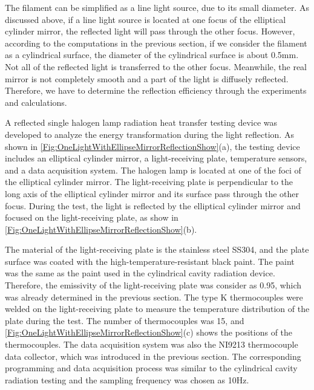 The filament can be simplified as a line light source, due to its small diameter. As discussed above, if a line light source is located at one focus of the elliptical cylinder mirror, the reflected light will pass through the other focus.
However, according to the computations in the previous section, if we consider the filament as a cylindrical surface, the diameter of the cylindrical surface is about 0.5mm. Not all of the reflected light is transferred to the other focus.
Meanwhile, the real mirror is not completely smooth and a part of the light is diffusely reflected. Therefore, we have to determine the reflection efficiency through the experiments and calculations.

A reflected single halogen lamp radiation heat transfer testing device was developed to analyze the energy transformation during the light reflection.
As shown in \ref{Fig:OneLightWithEllipseMirrorReflectionShow}(a), the testing
device includes an elliptical cylinder mirror, a light-receiving plate, temperature sensors, and a data acquisition system.
The halogen lamp is located at one of the foci of the elliptical cylinder mirror. The light-receiving plate is perpendicular to the long axis of the elliptical cylinder mirror and its surface pass through the other focus. During the test, the light is reflected by the elliptical cylinder mirror and focused on the light-receiving plate, as show in \ref{Fig:OneLightWithEllipseMirrorReflectionShow}(b).


The material of the light-receiving plate is the stainless steel SS304, and the plate surface was coated with the high-temperature-resistant black paint. The paint was the same as the paint used in the cylindrical cavity radiation device. Therefore, the emissivity of the light-receiving plate was consider as 0.95, which was already determined in the previous section.
The type K thermocouples were welded on the light-receiving plate to measure the temperature distribution of the plate during the test.
The number of thermocouples was 15, and \ref{Fig:OneLightWithEllipseMirrorReflectionShow}(c) shows the positions of the thermocouples. 
The data acquisition system was also the NI9213 thermocouple data collector, which was introduced in the previous section. The corresponding programming and data acquisition process was similar to the cylindrical cavity radiation testing and the sampling frequency was chosen as 10Hz.

